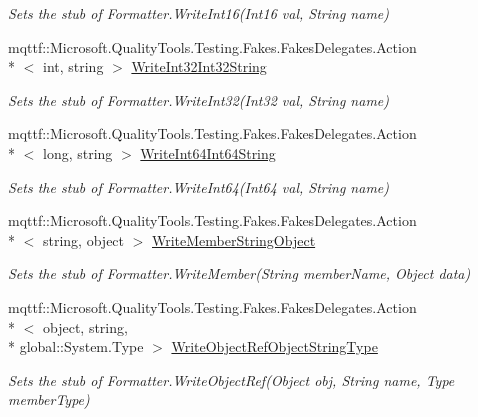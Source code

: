 \begin{DoxyCompactItemize}
\begin{DoxyCompactList}\small\item\em Sets the stub of Formatter.\-Write\-Int16(\-Int16 val, String name)\end{DoxyCompactList}\item 
mqttf\-::\-Microsoft.\-Quality\-Tools.\-Testing.\-Fakes.\-Fakes\-Delegates.\-Action\\*
$<$ int, string $>$ \hyperlink{class_system_1_1_runtime_1_1_serialization_1_1_fakes_1_1_stub_formatter_ac7c7c97dd2b65470d52ffc4752b542af}{Write\-Int32\-Int32\-String}
\begin{DoxyCompactList}\small\item\em Sets the stub of Formatter.\-Write\-Int32(\-Int32 val, String name)\end{DoxyCompactList}\item 
mqttf\-::\-Microsoft.\-Quality\-Tools.\-Testing.\-Fakes.\-Fakes\-Delegates.\-Action\\*
$<$ long, string $>$ \hyperlink{class_system_1_1_runtime_1_1_serialization_1_1_fakes_1_1_stub_formatter_a3cfcc55ac8f5735c95cecdd7559dab2a}{Write\-Int64\-Int64\-String}
\begin{DoxyCompactList}\small\item\em Sets the stub of Formatter.\-Write\-Int64(\-Int64 val, String name)\end{DoxyCompactList}\item 
mqttf\-::\-Microsoft.\-Quality\-Tools.\-Testing.\-Fakes.\-Fakes\-Delegates.\-Action\\*
$<$ string, object $>$ \hyperlink{class_system_1_1_runtime_1_1_serialization_1_1_fakes_1_1_stub_formatter_ac5920158ec990d7e3467f18fb40122db}{Write\-Member\-String\-Object}
\begin{DoxyCompactList}\small\item\em Sets the stub of Formatter.\-Write\-Member(\-String member\-Name, Object data)\end{DoxyCompactList}\item 
mqttf\-::\-Microsoft.\-Quality\-Tools.\-Testing.\-Fakes.\-Fakes\-Delegates.\-Action\\*
$<$ object, string, \\*
global\-::\-System.\-Type $>$ \hyperlink{class_system_1_1_runtime_1_1_serialization_1_1_fakes_1_1_stub_formatter_a1410892720327222b94287cd7cf993f5}{Write\-Object\-Ref\-Object\-String\-Type}
\begin{DoxyCompactList}\small\item\em Sets the stub of Formatter.\-Write\-Object\-Ref(\-Object obj, String name, Type member\-Type)\end{DoxyCompactList}\item 

\end{DoxyCompactItemize}
